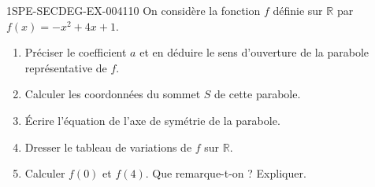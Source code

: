 \begin{exercice}{1SPE-SECDEG-EX-004}{1}{10}
On considère la fonction $f$ définie sur $\mathbb{R}$ par $f(x) = -x^2 + 4x + 1$.

\begin{enumerate}
  \item Préciser le coefficient $a$ et en déduire le sens d'ouverture de la parabole représentative de $f$.
  \item Calculer les coordonnées du sommet $S$ de cette parabole.
  \item Écrire l'équation de l'axe de symétrie de la parabole.
  \item Dresser le tableau de variations de $f$ sur $\mathbb{R}$.
  \item Calculer $f(0)$ et $f(4)$. Que remarque-t-on ? Expliquer.
\end{enumerate}
\end{exercice}
